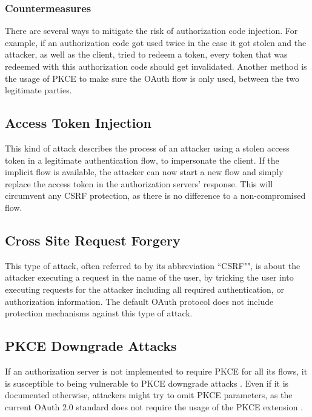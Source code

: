 \documentclass[
    fontsize=12pt,
    headings=small,
    parskip=half,           %
    bibliography=totoc,
    numbers=noenddot,       %
    open=any,               %
    ]{scrreprt}
\begin{document}
\subsubsection{Countermeasures}
There are several ways to mitigate the risk of authorization code injection.
For example, if an authorization code got used twice in the case it got stolen
and the attacker, as well as the client, tried to redeem a token, every token
that was redeemed with this authorization code should get invalidated. Another
method is the usage of PKCE to make sure the OAuth flow is only used, between
the two legitimate parties.



\subsection{Access Token Injection}
This kind of attack describes the process of an attacker using a stolen access
token in a legitimate authentication flow, to impersonate the client. If the
implicit flow is available, the attacker can now start a new flow and simply
replace the access token in the authorization servers' response. This will
circumvent any CSRF protection, as there is no difference to a non-compromised
flow. \cite{lodderstedt2020oauth}


\subsection{Cross Site Request Forgery}
This type of attack, often referred to by its abbreviation ``CSRF"", is about
the attacker executing a request in the name of the user, by tricking the user
into executing requests for the attacker including all required authentication,
or authorization information. The default OAuth protocol does not include
protection mechanisms against this type of attack. 

\subsection{PKCE Downgrade Attacks}
If an authorization server is not implemented to require PKCE for all its
flows, it is susceptible to being vulnerable to PKCE downgrade attacks
\cite{philippaerts2022oauch}. Even if it is documented otherwise, attackers
might try to omit PKCE parameters, as the current OAuth 2.0 standard does not
require the usage of the PKCE extension \cite{hardt2012rfc}. 
\end{document}
